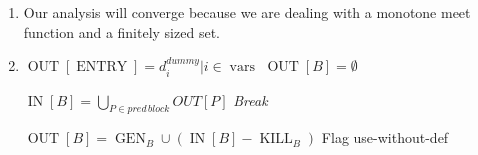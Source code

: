 \documentclass[12pt]{article}
\begin{document}
\begin{enumerate}
\item Our analysis will converge because we are dealing with a monotone meet
  function and a finitely sized set.

\item

\begin{algorithmic}
$\operatorname{OUT}[\operatorname{ENTRY}] = {d^{dummy}_i| i \in
      \operatorname{vars}}$
    \STATE $\operatorname{OUT}[B]=\emptyset$
\ENDFOR

        \STATE $\operatorname{IN}[B] = \bigcup_{P\in pred\, block}OUT[P]$
            \STATE \emph{Break}
        \ENDIF

        \STATE $\operatorname{OUT}[B]= \operatorname{GEN}_B \cup (\operatorname{IN}[B] - \operatorname{KILL}_B)$
            \STATE Flag use-without-def
        \ENDIF
    \ENDFOR
\ENDWHILE


\end{algorithmic}


\end{enumerate}
\end{document}
